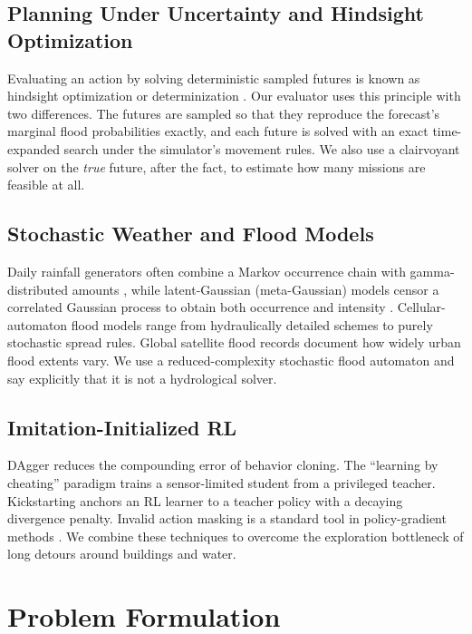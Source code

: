 \documentclass{ieeeaccess}
\begin{document}
\subsection{Planning Under Uncertainty and Hindsight Optimization}
Evaluating an action by solving deterministic sampled futures is known as hindsight optimization or determinization \cite{yoon2008}. Our evaluator uses this principle with two differences. The futures are sampled so that they reproduce the forecast's marginal flood probabilities exactly, and each future is solved with an exact time-expanded search under the simulator's movement rules. We also use a clairvoyant solver on the \emph{true} future, after the fact, to estimate how many missions are feasible at all.

\subsection{Stochastic Weather and Flood Models}
Daily rainfall generators often combine a Markov occurrence chain with gamma-distributed amounts \cite{richardson1981,wilks1998}, while latent-Gaussian (meta-Gaussian) models censor a correlated Gaussian process to obtain both occurrence and intensity \cite{bardossy1992,allcroft2003}. Cellular-automaton flood models range from hydraulically detailed schemes \cite{dottori2011} to purely stochastic spread rules. Global satellite flood records \cite{tellman2021} document how widely urban flood extents vary. We use a reduced-complexity stochastic flood automaton and say explicitly that it is not a hydrological solver.

\subsection{Imitation-Initialized RL}
DAgger \cite{ross2011} reduces the compounding error of behavior cloning. The ``learning by cheating'' paradigm \cite{chen2019} trains a sensor-limited student from a privileged teacher. Kickstarting \cite{schmitt2018} anchors an RL learner to a teacher policy with a decaying divergence penalty. Invalid action masking is a standard tool in policy-gradient methods \cite{huang2022}. We combine these techniques to overcome the exploration bottleneck of long detours around buildings and water.

\section{Problem Formulation}
\label{sec:problem}
\end{document}
